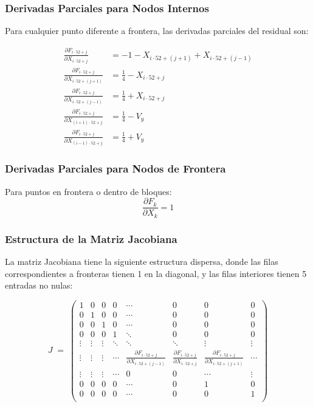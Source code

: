 \documentclass[11pt,letterpaper]{article}
\begin{document}
\subsubsection{Derivadas Parciales para Nodos Internos}

Para cualquier punto diferente a frontera, las derivadas parciales del residual son:

\begin{align}
\frac{\partial F_{i\cdot 52 + j}}{\partial X_{i\cdot 52 + j}} &= -1 - X_{i\cdot 52 + (j+1)} + X_{i\cdot 52 + (j-1)} \\[8pt]
\frac{\partial F_{i\cdot 52 + j}}{\partial X_{i\cdot 52 + (j+1)}} &= \tfrac{1}{4} - X_{i\cdot 52 + j} \\[8pt]
\frac{\partial F_{i\cdot 52 + j}}{\partial X_{i\cdot 52 + (j-1)}} &= \tfrac{1}{4} + X_{i\cdot 52 + j} \\[8pt]
\frac{\partial F_{i\cdot 52 + j}}{\partial X_{(i+1)\cdot 52 + j}} &= \tfrac{1}{4} - V_{y} \\[8pt]
\frac{\partial F_{i\cdot 52 + j}}{\partial X_{(i-1)\cdot 52 + j}} &= \tfrac{1}{4} + V_{y}
\end{align}

\subsubsection{Derivadas Parciales para Nodos de Frontera}

Para puntos en frontera o dentro de bloques:
\[
\frac{\partial F_{k}}{\partial X_{k}} = 1
\]

\subsubsection{Estructura de la Matriz Jacobiana}

La matriz Jacobiana tiene la siguiente estructura dispersa, donde las filas correspondientes a fronteras tienen 1 en la diagonal, y las filas interiores tienen 5 entradas no nulas:

\[
J \;=\;
\begin{pmatrix}
1 & 0 & 0 & 0 & \cdots & 0 & 0 & 0 \\
0 & 1 & 0 & 0 & \cdots & 0 & 0 & 0 \\
0 & 0 & 1 & 0 & \cdots & 0 & 0 & 0 \\
0 & 0 & 0 & 1 & \ddots & 0 & 0 & 0 \\
\vdots & \vdots & \vdots & \ddots & \ddots & \ddots & \vdots & \vdots \\[6pt]
\vdots & \vdots & \vdots & \cdots &
\frac{\partial F_{i\cdot 52 + j}}{\partial X_{i\cdot 52 + (j-1)}} &
\frac{\partial F_{i\cdot 52 + j}}{\partial X_{i\cdot 52 + j}} &
\frac{\partial F_{i\cdot 52 + j}}{\partial X_{i\cdot 52 + (j+1)}} &
\cdots \\[10pt]
\vdots & \vdots & \vdots & \cdots &
0 &
0 &
\cdots & \vdots \\[6pt]
0 & 0 & 0 & 0 & \cdots & 0 & 1 & 0 \\
0 & 0 & 0 & 0 & \cdots & 0 & 0 & 1 \\
\end{pmatrix}
\]
\end{document}
